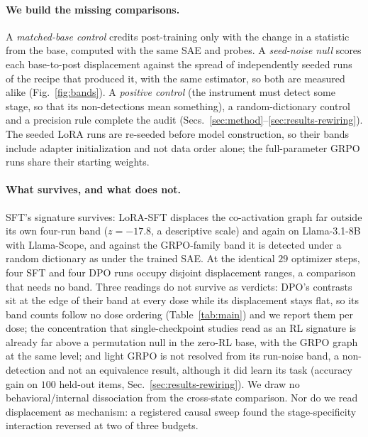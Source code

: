 \documentclass{article}
\begin{document}
\paragraph{We build the missing comparisons.}
A \emph{matched-base control} credits post-training only with the change in a statistic from the base, computed with the same SAE and probes. A \emph{seed-noise null} scores each base-to-post displacement against the spread of independently seeded runs of the recipe that produced it, with the same estimator, so both are measured alike (Fig.~\ref{fig:bands}). A \emph{positive control} (the instrument must detect some stage, so that its non-detections mean something), a random-dictionary control and a precision rule complete the audit (Secs.~\ref{sec:method}--\ref{sec:results-rewiring}). The seeded LoRA runs are re-seeded before model construction, so their bands include adapter initialization and not data order alone; the full-parameter GRPO runs share their starting weights.

\paragraph{What survives, and what does not.}
SFT's signature survives: LoRA-SFT displaces the co-activation graph far outside its own four-run band ($z=-17.8$, a descriptive scale) and again on Llama-3.1-8B with Llama-Scope, and against the GRPO-family band it is detected under a random dictionary as under the trained SAE. At the identical $29$ optimizer steps, four SFT and four DPO runs occupy disjoint displacement ranges, a comparison that needs no band. Three readings do not survive as verdicts: DPO's contrasts sit at the edge of their band at every dose while its displacement stays flat, so its band counts follow no dose ordering (Table~\ref{tab:main}) and we report them per dose; the concentration that single-checkpoint studies read as an RL signature is already far above a permutation null in the zero-RL base, with the GRPO graph at the same level; and light GRPO is not resolved from its run-noise band, a non-detection and not an equivalence result, although it did learn its task (accuracy gain on $100$ held-out items, Sec.~\ref{sec:results-rewiring}). We draw no behavioral/internal dissociation from the cross-state comparison. Nor do we read displacement as mechanism: a registered causal sweep found the stage-specificity interaction reversed at two of three budgets.
\end{document}
